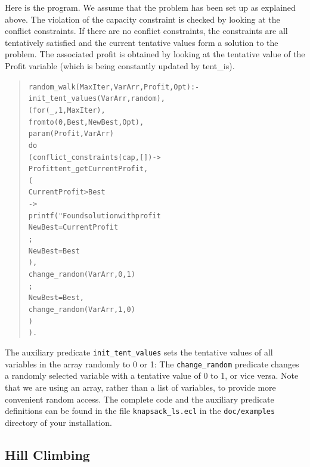 Here is the {\eclipse} program. We assume that the problem has been set
up as explained above. The violation of the capacity constraint
is checked by looking at the conflict constraints. If there are no
conflict constraints, the constraints are all tentatively satisfied
and the current tentative values form a solution to the problem.
The associated profit is obtained by looking at the tentative value
of the Profit variable (which is being constantly updated by tent\_is).
\begin{quote}\begin{alltt}
random_walk(MaxIter, VarArr, Profit, Opt) :-
        init_tent_values(VarArr, random),       %
        (   for(_,1,MaxIter),                   %
            fromto(0, Best, NewBest, Opt),      %
            param(Profit,VarArr)
        do
            ( conflict_constraints(cap,[]) ->   %
                Profit tent_get CurrentProfit,  %
                (
                    CurrentProfit > Best        %
                ->
                    printf("Found solution with profit %
                    NewBest=CurrentProfit       %
                ;
                    NewBest=Best                %
                ),
                change_random(VarArr, 0, 1)     %
            ;
                NewBest=Best,
                change_random(VarArr, 1, 0)     %
            )
        ).
\end{alltt}\end{quote}
The auxiliary predicate {\tt init_tent_values} sets the tentative values
of all variables in the array randomly to 0 or 1:
The {\tt change_random} predicate changes a randomly selected variable with
a tentative value of 0 to 1, or vice versa.
Note that we are using an array, rather than a list of variables, to
provide more convenient random access.
The complete code and the auxiliary predicate definitions can be found
in the file {\tt knapsack_ls.ecl} in the {\tt doc/examples} directory of your
{\eclipse} installation.


\subsection{Hill Climbing}

